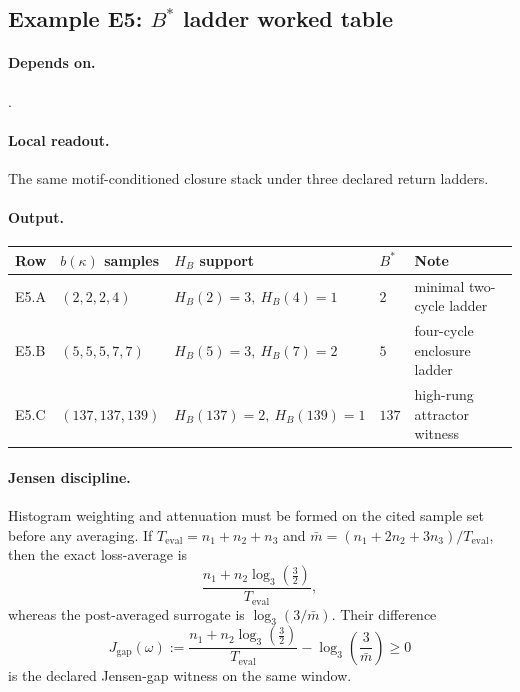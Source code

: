 \subsection{Example E5: \texorpdfstring{$B^*$}{B*} ladder worked table}\label{ex:e5}
\paragraph{Depends on.} .
\paragraph{Local readout.} The same motif-conditioned closure stack under three declared return ladders.
\paragraph{Output.}
{\footnotesize
\begin{center}
\begin{tabular}{@{}lllll@{}}
\toprule
Row & $b(\kappa)$ samples & $H_B$ support & $B^*$ & Note \\
\midrule
E5.A & $(2,2,2,4)$ & $H_B(2)=3,\ H_B(4)=1$ & $2$ & minimal two-cycle ladder \\
E5.B & $(5,5,5,7,7)$ & $H_B(5)=3,\ H_B(7)=2$ & $5$ & four-cycle enclosure ladder \\
E5.C & $(137,137,139)$ & $H_B(137)=2,\ H_B(139)=1$ & $137$ & high-rung attractor witness \\
\bottomrule
\end{tabular}
\end{center}}
\paragraph{Jensen discipline.} Histogram weighting and attenuation must be formed on the cited sample set before any averaging. If $T_{\mathrm{eval}}=n_1+n_2+n_3$ and $\bar m=(n_1+2n_2+3n_3)/T_{\mathrm{eval}}$, then the exact loss-average is
\[
\frac{n_1+n_2\log_3\!\left(\frac{3}{2}\right)}{T_{\mathrm{eval}}},
\]
whereas the post-averaged surrogate is $\log_3(3/\bar m)$. Their difference
\[
J_{\mathrm{gap}}(\omega):=
\frac{n_1+n_2\log_3\!\left(\frac{3}{2}\right)}{T_{\mathrm{eval}}}-\log_3\!\left(\frac{3}{\bar m}\right)\ge 0
\]
is the declared Jensen-gap witness on the same window.

